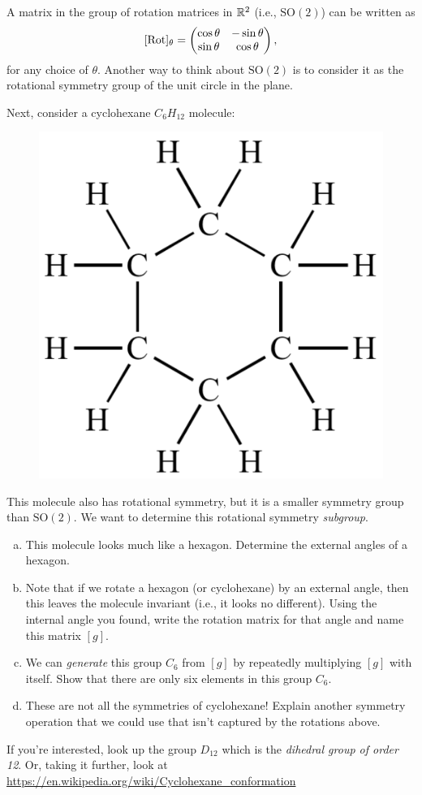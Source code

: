 \documentclass[12pt]{article} %
\begin{document}
\newpage
\begin{problem}
A matrix in the group of rotation matrices in $\mathbb{R}^2$ (i.e., $\mathrm{SO}(2)$) can be written as
\[
[\mathrm{Rot}]_\theta = \begin{pmatrix} \cos \theta & - \sin \theta \\ \sin \theta & \cos \theta \end{pmatrix},
\]
for any choice of $\theta$. Another way to think about $\mathrm{SO}(2)$ is to consider it as the rotational symmetry group of the unit circle in the plane.

Next, consider a cyclohexane $C_6H_{12}$ molecule:
    \begin{figure}[H]
        \centering
        \includegraphics[width=.3\textwidth]{cyclohexane-500x500.png}
    \end{figure}
    \noindent This molecule also has rotational symmetry, but it is a smaller symmetry group than $\mathrm{SO}(2)$. We want to determine this rotational symmetry \emph{subgroup}.
\begin{enumerate}[(a)]
    \item This molecule looks much like a hexagon. Determine the external angles of a hexagon.
    \item Note that if we rotate a hexagon (or cyclohexane) by an external angle, then this leaves the molecule invariant (i.e., it looks no different). Using the internal angle you found, write the rotation matrix for that angle and name this matrix $[g]$.
    \item We can \emph{generate} this group $C_6$ from $[g]$ by repeatedly multiplying $[g]$ with itself.  Show that there are only six elements in this group $C_6$.
    \item These are not all the symmetries of cyclohexane! Explain another symmetry operation that we could use that isn't captured by the rotations above.
\end{enumerate}
If you're interested, look up the group $D_{12}$ which is the \emph{dihedral group of order 12}. Or, taking it further, look at \url{https://en.wikipedia.org/wiki/Cyclohexane_conformation}
\end{problem}
\end{document}
